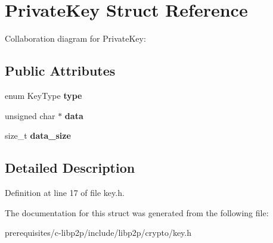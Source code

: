 \hypertarget{struct_private_key}{}\section{Private\+Key Struct Reference}
\label{struct_private_key}


Collaboration diagram for Private\+Key\+:
\subsection*{Public Attributes}
\begin{DoxyCompactItemize}
\item 
\mbox{\label{struct_private_key_a3616f2a86cd04efff67f530d9121efc6}} 
enum Key\+Type {\bfseries type}
\item 
\mbox{\label{struct_private_key_a8d76547f3f6909ce7d85ac6725481fd5}} 
unsigned char $\ast$ {\bfseries data}
\item 
\mbox{\label{struct_private_key_a2ccb890116a64a711780fdd3cb7a859e}} 
size\+\_\+t {\bfseries data\+\_\+size}
\end{DoxyCompactItemize}


\subsection{Detailed Description}


Definition at line 17 of file key.\+h.



The documentation for this struct was generated from the following file\+:\begin{DoxyCompactItemize}
\item 
prerequisites/c-\/libp2p/include/libp2p/crypto/key.\+h\end{DoxyCompactItemize}
